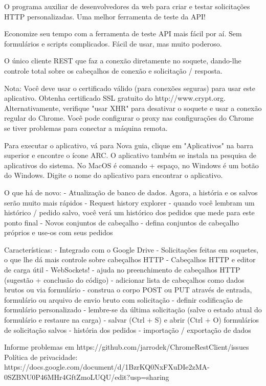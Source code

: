 O programa auxiliar de desenvolvedores da web para criar e testar solicitações HTTP personalizadas.
Uma melhor ferramenta de teste da API!

Economize seu tempo com a ferramenta de teste API mais fácil por aí. Sem formulários e scripts complicados. Fácil de usar, mas muito poderoso.

O único cliente REST que faz a conexão diretamente no soquete, dando-lhe controle total sobre os cabeçalhos de conexão e solicitação / resposta.

Nota: Você deve usar o certificado válido (para conexões seguras) para usar este aplicativo. Obtenha certificado SSL gratuito do http://www.crypt.org. Alternativamente, verifique "usar XHR" para desativar o soquete e usar a conexão regular do Chrome.
Você pode configurar o proxy nas configurações do Chrome se tiver problemas para conectar a máquina remota.

Para executar o aplicativo, vá para Nova guia, clique em "Aplicativos" na barra superior e encontre o ícone ARC. O aplicativo também se instala na pesquisa de aplicativos do sistema. No MacOS é comando + espaço, no Windows é um botão do Windows. Digite o nome do aplicativo para encontrar o aplicativo.

O que há de novo:
- Atualização de banco de dados. Agora, a história e os salvos serão muito mais rápidos
- Request history explorer - quando você lembram um histórico / pedido salvo, você verá um histórico dos pedidos que mede para este ponto final
- Novos conjuntos de cabeçalho - defina conjuntos de cabeçalho próprios e use-os com seus pedidos

Características:
- Integrado com o Google Drive
- Solicitações feitas em soquetes, o que lhe dá mais controle sobre cabeçalhos HTTP
- Cabeçalhos HTTP e editor de carga útil
- WebSockets!
- ajuda no preenchimento de cabeçalhos HTTP (sugestão + conclusão do código)
- adicionar lista de cabeçalhos como dados brutos ou via formulário
- construa o corpo POST ou PUT através de entrada, formulário ou arquivo de envio bruto com solicitação
- definir codificação de formulário personalizado
- lembre-se da última solicitação (salve o estado atual do formulário e restaure na carga)
- salvar (Ctrl + S) e abrir (Ctrl + O) formulários de solicitação salvos
- história dos pedidos
- importação / exportação de dados

Informe problemas em https://github.com/jarrodek/ChromeRestClient/issues
Política de privacidade: https://docs.google.com/document/d/1BzrKQ0NxFXuDIe2zMA-0SZBNU0P46MHr4GftZmoLUQU/edit?usp=sharing



